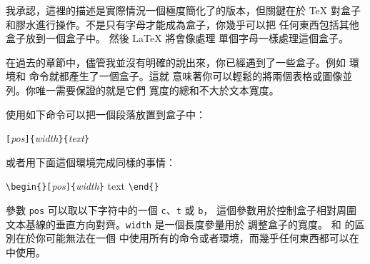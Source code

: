 我承認，這裡的描述是實際情況一個極度簡化了的版本，但關鍵在於 \TeX{} 
對盒子和膠水進行操作。不是只有字母才能成為盒子，你幾乎可以把
任何東西包括其他盒子放到一個盒子中。 然後 \LaTeX{} 將會像處理
單個字母一樣處理這個盒子。

在過去的章節中，儘管我並沒有明確的說出來，你已經遇到了一些盒子。例如
  環境和  命令就都產生了一個盒子。這就
意味著你可以輕鬆的將兩個表格或圖像並列。你唯一需要保證的就是它們
寬度的總和不大於文本寬度。

使用如下命令可以把一個段落放置到盒子中：
\begin{lscommand}
\verb|[|\emph{pos}\verb|]{|\emph{width}\verb|}{|\emph{text}\verb|}|
\end{lscommand}

\noindent 或者用下面這個環境完成同樣的事情：

\begin{lscommand}
\verb|\begin{|\verb|}[|\emph{pos}\verb|]{|\emph{width}\verb|}| text
\verb|\end{|\verb|}|
\end{lscommand}

參數 \texttt{pos} 可以取以下字符中的一個 \texttt{c}、\texttt{t}
 或 \texttt{b}，
這個參數用於控制盒子相對周圍文本基線的垂直方向對齊。\texttt{width} 是一個長度參量用於
調整盒子的寬度。 和  的區別在於你可能無法在一個  中使用所有的命令或者環境，而幾乎任何東西都可以在  中使用。

